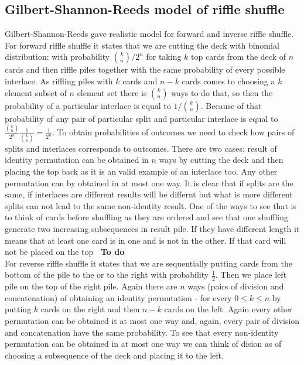 \documentclass[a4paper, 12pt]{article}
\newcommand{\smalltodo}[1]{\textbf{\ To do}}
\begin{document}
\subsection{Gilbert-Shannon-Reeds model of riffle shuffle}
Gilbert-Shannon-Reeds gave realistic model for forward and inverse riffle shuffle.
For forward riffle shuffle it states that we are cutting the deck with binomial distribution:
with probability $\binom{k}{n}/2^n$ for taking $k$ top cards from the deck of $n$ cards
and then riffle piles together with the same probability of every possible interlace. As riffling piles with
$k$ cards and $n-k$ cards comes to choosing a $k$ element subset of $n$ element set there is $\binom{k}{n}$
ways to do that, so then the probability of a particular interlace is equal to $1/\binom{k}{n}$.
Because of that probability of any pair of particular split and particular interlace is equal to
$\frac{\binom{k}{n}}{2^n}\frac{1}{\binom{k}{n}} = \frac{1}{2^n}$. To obtain probabilities of outcomes
we need to check how pairs of splits and interlaces corresponds to outcomes. There are two cases:
result of identity permutation can be obtained in $n$ ways by cutting the deck and then placing the top back
as it is an valid example of an interlace too. Any other permutation can by obtained in at most one way.
It is clear that if splits are the same, if interlaces are different results will be differnt but what is
more different splits can not lead to the same non-identity result. One of the ways to see that is to think
of cards before shuffling as they are ordered and see that one shuffling generate two increasing subsequences
in result pile. If they have different length it means that at least one card is in one and is not
in the other. If that card will not be placed on the top \smalltodo \\ \\
For reverse riffle shuffle it states that we are sequentially putting cards from the bottom of the pile to
the or to the right with probability $\frac{1}{2}$. Then we place left pile on the top of the right pile.
Again there are $n$ ways (pairs of division and concatenation) of obtaining an identity permutation -
for every $0 \leq k \leq n$ by putting $k$ cards on the right and then $n-k$ cards on the left.
Again every other permutation can be obtained it at most one way and, again, every pair of division and
concatenation have the same probability. To see that every non-identity permutation can be obtained in
at most one way we can think of dision as of choosing a subsequence of the deck and placing it to the left.
\end{document}
